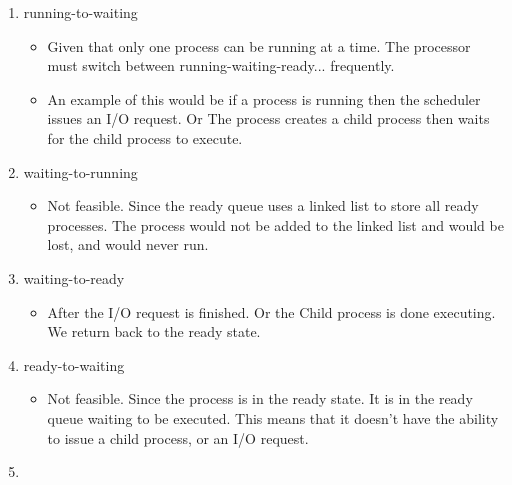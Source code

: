 \documentclass{article} %
\begin{document}
\begin{enumerate}
\begin{enumerate}[label=(\alph*)]
            \item
                        running-to-waiting
                \begin{itemize}
                    \item 
                        Given that only one process can be running at a time.
                        The processor must switch between running-waiting-ready...
                        frequently.
                    \item 
                        An example of this would be if a process is running
                        then the scheduler issues an I/O request. Or The 
                        process creates a child process then waits for the 
                        child process to execute.
                \hfill
                \end{itemize}
            \item
                        waiting-to-running
                \begin{itemize}
                    \item 
                        Not feasible. Since the ready queue uses a linked list
                        to store all ready processes. The process would not 
                        be added to the linked list and would be lost, and would
                        never run.
                \end{itemize}
                \hfill
            \item
                        waiting-to-ready
                \begin{itemize}
                    \item 
                        After the I/O request is finished. Or the Child process
                        is done executing. We return back to the ready state.
                \end{itemize}
                \hfill
            \item
                        ready-to-waiting
                \begin{itemize}
                    \item 
                        Not feasible. Since the process is in the ready state. 
                        It is in the ready queue waiting to be executed. This means
                        that it doesn't have the ability to issue a child process,
                        or an I/O request.
                \end{itemize}
                \newpage
            \item

\end{enumerate}
\end{enumerate}
\end{document}
